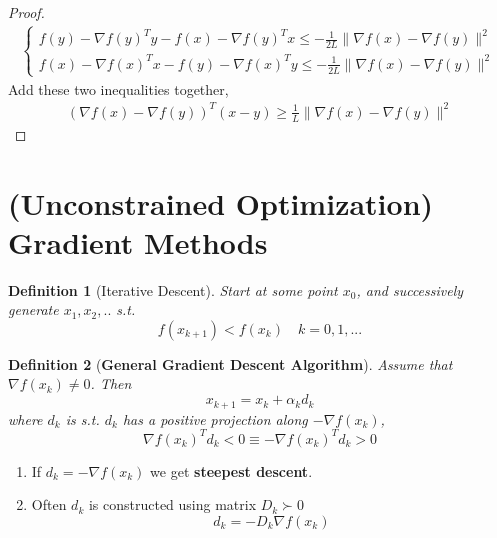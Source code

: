 \documentclass[11pt,a4paper]{article}
\newtheorem{definition}{Definition}
\begin{document}
\begin{proof}
\begin{equation}
    \begin{aligned}
        \left\{\begin{matrix}
            f(y)-\nabla f(y)^Ty-f(x)-\nabla f(y)^Tx\leq -\frac{1}{2L}\|\nabla f(x)-\nabla f(y)\|^2\\
            f(x)-\nabla f(x)^Tx-f(y)-\nabla f(x)^Ty\leq -\frac{1}{2L}\|\nabla f(x)-\nabla f(y)\|^2
        \end{matrix}\right.
    \end{aligned}
    \nonumber
\end{equation}
Add these two inequalities together,
\begin{equation}
    \begin{aligned}
        (\nabla f(x)-\nabla f(y))^T(x-y)\geq \frac{1}{L}\|\nabla f(x)-\nabla f(y)\|^2
    \end{aligned}
    \nonumber
\end{equation}
\end{proof}















\section{(Unconstrained Optimization) Gradient Methods}
\begin{definition}[Iterative Descent]
Start at some point $x_0$, and successively generate $x_1,x_2,..$ s.t. $$f(x_{k+1})<f(x_k)\quad k=0,1,...$$
\end{definition}

\begin{definition}[\textbf{General Gradient Descent Algorithm}]
    Assume that $\nabla f(x_k)\neq 0$. Then
    $$x_{k+1}=x_k+\alpha_k d_k$$
    where $d_k$ is s.t. $d_k$ has a positive projection along $-\nabla f(x_k)$,
    $$\nabla f(x_k)^T d_k<0 \equiv -\nabla f(x_k)^T d_k>0$$
\end{definition}
\begin{enumerate}[$\bullet$]
    \item If $d_k=-\nabla f(x_k)$ we get \textbf{steepest descent}.
    \item Often $d_k$ is constructed using matrix $D_k \succ 0$ $$d_k=-D_k\nabla f(x_k)$$
\end{enumerate}
\end{document}
